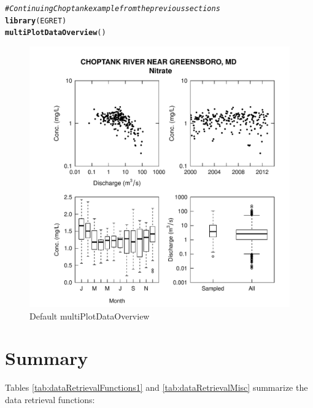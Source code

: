 \documentclass[a4paper,11pt]{article}\usepackage[]{graphicx}\usepackage[]{color}
\makeatletter
\def\maxwidth{ %
  \ifdim\Gin@nat@width>\linewidth
    \linewidth
  \else
    \Gin@nat@width
  \fi
}
\newcommand{\hlcom}[1]{\textcolor[rgb]{0.678,0.584,0.686}{\textit{#1}}}%
\newcommand{\hlstd}[1]{\textcolor[rgb]{0.345,0.345,0.345}{#1}}%
\newcommand{\hlkwd}[1]{\textcolor[rgb]{0.737,0.353,0.396}{\textbf{#1}}}%
\newenvironment{kframe}{%
 \def\at@end@of@kframe{}%
 \ifinner\ifhmode%
  \def\at@end@of@kframe{\end{minipage}}%
  \begin{minipage}{\columnwidth}%
 \fi\fi%
 \def\FrameCommand##1{\hskip\@totalleftmargin \hskip-\fboxsep
 \colorbox{shadecolor}{##1}\hskip-\fboxsep
     \hskip-\linewidth \hskip-\@totalleftmargin \hskip\columnwidth}%
 \MakeFramed {\advance\hsize-\width
   \@totalleftmargin\z@ \linewidth\hsize
   \@setminipage}}%
 {\par\unskip\endMakeFramed%
 \at@end@of@kframe}
\newenvironment{knitrout}{}{} %
\makeatother
\begin{document}
\begin{knitrout}
\color{fgcolor}\begin{kframe}
\begin{alltt}
\hlcom{# Continuing Choptank example from the previous sections}
\hlkwd{library}\hlstd{(EGRET)}
\hlkwd{multiPlotDataOverview}\hlstd{()}
\end{alltt}
\end{kframe}\begin{figure}[]

\includegraphics[width=\maxwidth]{figure/egretEx} \caption[Default multiPlotDataOverview]{Default multiPlotDataOverview\label{fig:egretEx}}
\end{figure}


\end{knitrout}


\FloatBarrier
\clearpage


\section{Summary}
\label{sec:summary}

Tables \ref{tab:dataRetrievalFunctions1} and \ref{tab:dataRetrievalMisc} summarize the data retrieval functions:
\end{document}
